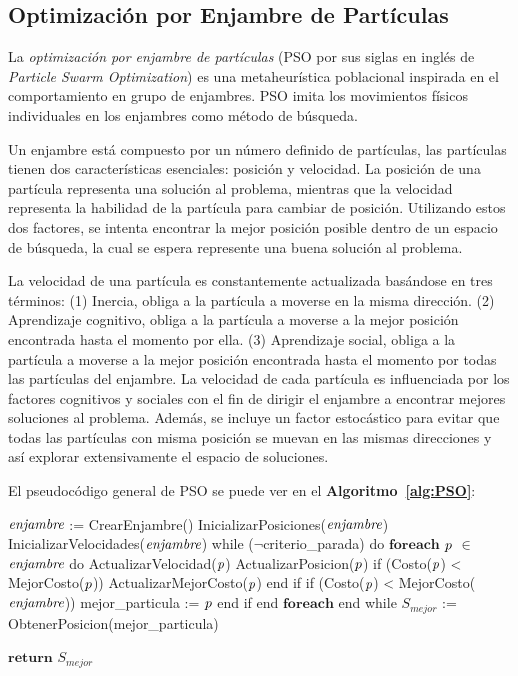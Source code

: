 \subsection{Optimización por Enjambre de Partículas} \label{subsect:pso}

La \emph{optimización por enjambre de partículas} (PSO por sus siglas en inglés de \emph{Particle Swarm Optimization}) es una metaheurística poblacional inspirada en el comportamiento en grupo de enjambres. PSO imita los movimientos físicos individuales en los enjambres como método de búsqueda. 

Un enjambre está compuesto por un número definido de partículas, las partículas tienen dos características esenciales: posición y  velocidad. La posición de una partícula representa una solución al problema, mientras que la velocidad representa la habilidad de la partícula  para cambiar de posición. Utilizando estos dos factores, se intenta encontrar la mejor posición posible dentro de un espacio de búsqueda, la  cual se espera represente una buena solución al problema.

La velocidad de una partícula es constantemente actualizada basándose en tres términos: (1) Inercia, obliga a la partícula a moverse en la misma dirección. (2) Aprendizaje cognitivo, obliga a la partícula a moverse a la mejor posición encontrada hasta el momento por ella. (3) Aprendizaje social, obliga a la partícula a moverse a la mejor posición encontrada hasta el momento por todas las partículas del enjambre.
La velocidad de cada partícula es influenciada por los factores cognitivos y sociales con el fin de dirigir el enjambre a encontrar mejores soluciones al problema. Además, se incluye un factor estocástico para evitar que todas las partículas con misma posición se muevan en las mismas direcciones y así explorar extensivamente el espacio de soluciones.

El pseudocódigo general de PSO se puede ver en el \textbf{Algoritmo~\ref{alg:PSO}}:

\begin{code}[includerangemarker=false,frame=single,label=alg:PSO,caption=Pseudocódigo de Optimización por Enjambre de Partículas,firstnumber=100, mathescape]
$\emph{enjambre}$ := CrearEnjambre()
InicializarPosiciones($\emph{enjambre}$)
InicializarVelocidades($\emph{enjambre}$)
while ($\neg$criterio_parada) do
	$\textbf{foreach}$ $\emph{p}$ $\in$ $\emph{enjambre}$ do
		ActualizarVelocidad($\emph{p}$)
		ActualizarPosicion($\emph{p}$)
		if (Costo($\emph{p}$) < MejorCosto($\emph{p}$))
			ActualizarMejorCosto($\emph{p}$)
		end if
		if (Costo($\emph{p}$) < MejorCosto($\emph{enjambre}$))
			mejor_particula := $\emph{p}$
		end if
	end $\textbf{foreach}$
end while
$S_{mejor}$ := ObtenerPosicion(mejor_particula)

$\textbf{return}$ $S_{mejor}$
\end{code}

